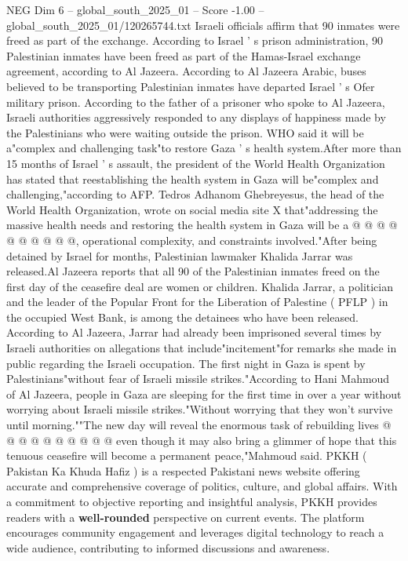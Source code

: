 \begin{textsample}{NEG Dim 6 – global\_south\_2025\_01 – Score -1.00 – global\_south\_2025\_01/120265744.txt}  \label{ex:f6_neg_089}
Israeli officials affirm that 90 inmates were freed as part of the exchange.
According to Israel ' s prison administration, 90 Palestinian inmates have been freed as part of the Hamas-Israel exchange agreement, according to Al Jazeera.
According to Al Jazeera Arabic, buses believed to be transporting Palestinian inmates have departed Israel ' s Ofer military prison.
According to the father of a prisoner who spoke to Al Jazeera, Israeli authorities aggressively responded to any displays of happiness made by the Palestinians who were waiting outside the prison.
WHO said it will be a"complex and challenging task"to restore Gaza ' s health system.After more than 15 months of Israel ' s assault, the president of the World Health Organization has stated that reestablishing the health system in Gaza will be"complex and challenging,"according to AFP.
Tedros Adhanom Ghebreyesus, the head of the World Health Organization, wrote on social media site X that"addressing the massive health needs and restoring the health system in Gaza will be a @ @ @ @ @ @ @ @ @ @, operational complexity, and constraints involved."After being detained by Israel for months, Palestinian lawmaker Khalida Jarrar was released.Al Jazeera reports that all 90 of the Palestinian inmates freed on the first day of the ceasefire deal are women or children.
Khalida Jarrar, a politician and the leader of the Popular Front for the Liberation of Palestine ( PFLP ) in the occupied West Bank, is among the detainees who have been released.
According to Al Jazeera, Jarrar had already been imprisoned several times by Israeli authorities on allegations that include"incitement"for remarks she made in public regarding the Israeli occupation.
The first night in Gaza is spent by Palestinians"without fear of Israeli missile strikes."According to Hani Mahmoud of Al Jazeera, people in Gaza are sleeping for the first time in over a year without worrying about Israeli missile strikes."Without worrying that they won't survive until morning.""The new day will reveal the enormous task of rebuilding lives @ @ @ @ @ @ @ @ @ @ even though it may also bring a glimmer of hope that this tenuous ceasefire will become a permanent peace,"Mahmoud said.
PKKH ( Pakistan Ka Khuda Hafiz ) is a respected Pakistani news website offering accurate and comprehensive coverage of politics, culture, and global affairs.
With a commitment to objective reporting and insightful analysis, PKKH provides readers with a \textbf{well-rounded} perspective on current events.
The platform encourages community engagement and leverages digital technology to reach a wide audience, contributing to informed discussions and awareness.

\end{textsample}
